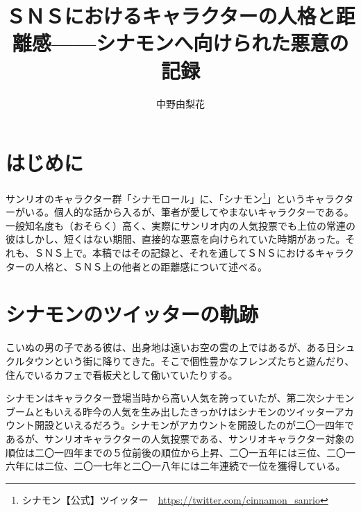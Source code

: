 \documentclass[b5j,twoside,twocolumn]{utarticle}
\title{\tbaselineshift =4.0pt ＳＮＳにおけるキャラクターの人格と距離感------シナモンへ向けられた悪意の記録}
\author{中野由梨花}
\date{\vspace{-5mm}}
\makeatletter
\def\yakuchu{%
\@ifnextchar[\@xfootnote %
{\stepcounter{yakuchu}%
\protected@xdef\@thefnmark{\theyakuchu}%
\@footnotemark\@footnotetext}}
\makeatother
\begin{document}
\maketitle

\setlength{\footskip}{-2mm}
\chead[]{}
\lfoot[]{\thepage{}}
\cfoot[]{}
\rfoot[\thepage{}]{}

\let\yakuchu=\endnote
\renewcommand{\footnoterule}{\noindent\rule{100mm}{0.3mm}\vskip2mm}
\thispagestyle{fancy}

\section*{はじめに}

サンリオのキャラクター群「シナモロール」に、「シナモン\footnote{シナモン【公式】ツイッター　\url{https://twitter.com/cinnamon_sanrio}}」というキャラクターがいる。個人的な話から入るが、筆者が愛してやまないキャラクターである。一般知名度も（おそらく）高く、実際にサンリオ内の人気投票でも上位の常連の彼はしかし、短くはない期間、直接的な悪意を向けられていた時期があった。それも、ＳＮＳ上で。本稿ではその記録と、それを通してＳＮＳにおけるキャラクターの人格と、ＳＮＳ上の他者との距離感について述べる。
\section*{シナモンのツイッターの軌跡}
こいぬの男の子である彼は、出身地は遠いお空の雲の上ではあるが、ある日シュクルタウンという街に降りてきた。そこで個性豊かなフレンズたちと遊んだり、住んでいるカフェで看板犬として働いていたりする。


シナモンはキャラクター登場当時から高い人気を誇っていたが、第二次シナモンブームともいえる昨今の人気を生み出したきっかけはシナモンのツイッターアカウント開設といえるだろう。シナモンがアカウントを開設したのが二〇一四年であるが、サンリオキャラクターの人気投票である、サンリオキャラクター対象の順位は二〇一四年までの５位前後の順位から上昇、二〇一五年には三位、二〇一六年には二位、二〇一七年と二〇一八年には二年連続で一位を獲得している。
\end{document}
